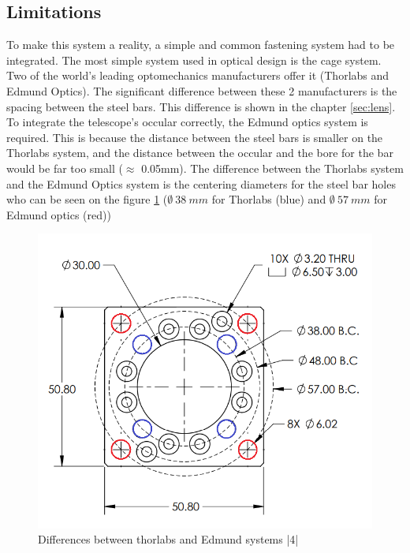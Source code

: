 \subsection{Limitations}
To make this system a reality, a simple and common fastening system had to be integrated. The most simple system used in optical design 
is the cage system. Two of the world's leading optomechanics manufacturers offer it (Thorlabs and Edmund Optics). The significant difference 
between these 2 manufacturers is the spacing between the steel bars. This difference is shown in the chapter \ref{sec:lens}. \newline
To integrate the telescope's occular correctly, the Edmund optics system is required. This is because the distance between the steel bars 
is smaller on the Thorlabs system, and the distance between the occular and the bore for the bar would be far too small ($\approx$ 0.05mm).
\bigbreak
The difference between the Thorlabs system and the Edmund Optics system is the centering diameters for the steel bar holes who 
can be seen on the figure \ref{fig:thorlabs_Edmund} ($\emptyset\ 38\ mm$ for Thorlabs (blue) and $\emptyset\ 57\ mm$ for Edmund optics (red))
\begin{figure}[H]
    \centering
    \includegraphics[scale=1]{assets/figures/Mechanical Design/Thorlabs_Edmund.png}
    \caption{Differences between thorlabs and Edmund systems |4|}
    \label{fig:thorlabs_Edmund}
\end{figure}
